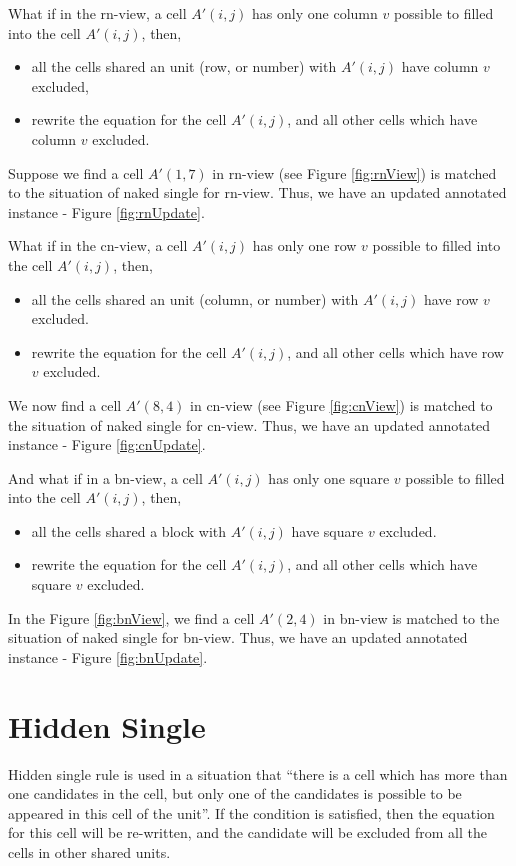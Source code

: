 \documentclass[11pt]{report}
\begin{document}
What if in the rn-view, a cell $A'(i,j)$ has only one column $v$ possible to filled into the cell $A'(i,j)$, then,
\begin{itemize}
\item all the cells shared an unit (row, or number) with $A'(i,j)$  have column $v$ excluded,
\item rewrite the equation for the cell $A'(i,j)$, and all other cells which have column $v$ excluded.
\end{itemize}
Suppose we find a cell $A'(1,7)$ in rn-view (see Figure \ref{fig:rnView}) is matched to the situation of naked single for rn-view. Thus, we have an updated annotated instance - Figure \ref{fig:rnUpdate}.

What if in the cn-view, a cell $A'(i,j)$ has only one row $v$ possible to filled into the cell $A'(i,j)$, then,
\begin{itemize}
\item all the cells shared an unit (column, or number) with $A'(i,j)$ have row $v$ excluded.
\item rewrite the equation for the cell $A'(i,j)$, and all other cells which have row $v$ excluded.
\end{itemize}
We now find a cell $A'(8,4)$ in cn-view (see Figure \ref{fig:cnView}) is matched to the situation of naked single for cn-view. Thus, we have an updated annotated instance - Figure \ref{fig:cnUpdate}.

And what if in a bn-view, a cell $A'(i,j)$ has only one square $v$ possible to filled into the cell $A'(i,j)$, then,
\begin{itemize}
\item all the cells shared a block with $A'(i,j)$ have square $v$ excluded.
\item rewrite the equation for the cell $A'(i,j)$, and all other cells which have square $v$ excluded.
\end{itemize}
In the Figure \ref{fig:bnView}, we find a cell $A'(2,4)$ in bn-view is matched to the situation of naked single for bn-view. Thus, we have an updated annotated instance - Figure \ref{fig:bnUpdate}.


\section{Hidden Single}
\label{sec:Hidden Single}

Hidden single rule is used in a situation that ``there is a cell which has more than one candidates in the cell, but only one of the candidates is possible to be appeared in this cell of the unit''. If the condition is satisfied, then the equation for this cell will be re-written, and the candidate will be excluded from all the cells in other shared units.
\end{document}
